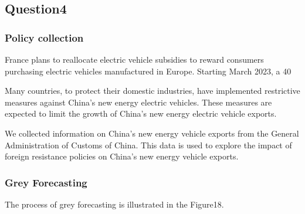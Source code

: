 \documentclass{apmcmthesis}
\begin{document}
\subsection{Question4}

\subsubsection{Policy collection}
France plans to reallocate electric vehicle subsidies to reward consumers purchasing electric vehicles manufactured in Europe. Starting March 2023, a 40%

Many countries, to protect their domestic industries, have implemented restrictive measures against China's new energy electric vehicles. These measures are expected to limit the growth of China's new energy electric vehicle exports.

We collected information on China's new energy vehicle exports from the General Administration of Customs of China. This data is used to explore the impact of foreign resistance policies on China's new energy vehicle exports.

\subsubsection{Grey Forecasting}
The process of grey forecasting is illustrated in the Figure18.
\end{document}
